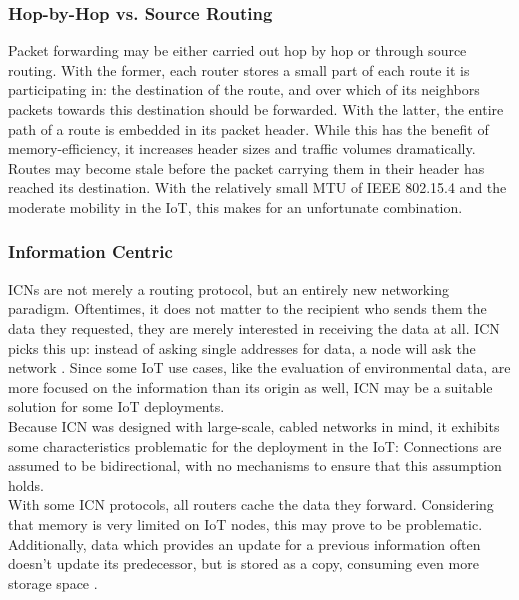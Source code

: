\subsubsection{Hop-by-Hop vs. Source Routing}
\label{subsec:appr_hbh_source}
Packet forwarding may be either carried out hop by hop or through source routing. With the former, each router stores a small part of each route it is participating in: the destination of the route, and over which of its neighbors packets towards this destination should be forwarded. With the latter, the entire path of a route is embedded in its packet header. While this has the benefit of memory-efficiency, it increases header sizes and traffic volumes dramatically. Routes may become stale before the packet carrying them in their header has reached its destination. With the relatively small MTU of IEEE 802.15.4 and the moderate mobility in the \gls{IoT}, this makes for an unfortunate combination.

\subsubsection{Information Centric}
\label{subsec:appr_char_infocentric}
\glspl{ICN} are not merely a routing protocol, but an entirely new networking paradigm. Oftentimes, it does not matter to the recipient who sends them the data they requested, they are merely interested in receiving the data at all. ICN picks this up: instead of asking single addresses for data, a node will ask the network \cite{ahlgren_ccn_survey}.
Since some \gls{IoT} use cases, like the evaluation of environmental data, are more focused on the information than its origin as well, ICN may be a suitable solution for some IoT deployments.\\
Because \gls{ICN} was designed with large-scale, cabled networks in mind, it exhibits some characteristics problematic for the deployment in the \gls{IoT}:
Connections are assumed to be bidirectional, with no mechanisms to ensure that this assumption holds.\\
With some ICN protocols, all routers cache the data they forward. Considering that memory is very limited on IoT nodes, this may prove to be problematic. Additionally, data which provides an update for a previous information often doesn't update its predecessor, but is stored as a copy, consuming even more storage space \cite{mehlis_ccn_iot}.


